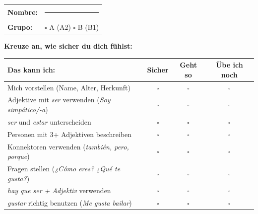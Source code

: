 \documentclass[11pt, a4paper]{article}
\begin{document}

\vspace{1.5cm}

\begin{tabular}{@{}ll@{}}
\textbf{Nombre:} & \rule{6cm}{0.4pt} \\[0.5cm]
\textbf{Grupo:} & $\square$ A (A2) \quad $\square$ B (B1) \\
\end{tabular}

\vspace{0.8cm}

\begin{center}
{\large\bfseries Kreuze an, wie sicher du dich fühlst:}
\end{center}

\vspace{0.5cm}

\renewcommand{\arraystretch}{1.6}

\begin{tabularx}{\textwidth}{|X|c|c|c|}
\hline
\rowcolor{spanisch!20}
\textbf{Das kann ich:} & \textbf{Sicher} & \textbf{Geht so} & \textbf{Übe ich noch} \\
\hline
Mich vorstellen (Name, Alter, Herkunft) & $\square$ & $\square$ & $\square$ \\
\hline
Adjektive mit \textit{ser} verwenden (\textit{Soy simpático/-a}) & $\square$ & $\square$ & $\square$ \\
\hline
\textit{ser} und \textit{estar} unterscheiden & $\square$ & $\square$ & $\square$ \\
\hline
Personen mit 3+ Adjektiven beschreiben & $\square$ & $\square$ & $\square$ \\
\hline
Konnektoren verwenden (\textit{también, pero, porque}) & $\square$ & $\square$ & $\square$ \\
\hline
Fragen stellen (\textit{¿Cómo eres? ¿Qué te gusta?}) & $\square$ & $\square$ & $\square$ \\
\hline
\textit{hay que ser + Adjektiv} verwenden & $\square$ & $\square$ & $\square$ \\
\hline
\textit{gustar} richtig benutzen (\textit{Me gusta bailar}) & $\square$ & $\square$ & $\square$ \\
\hline
\end{tabularx}
\end{document}
